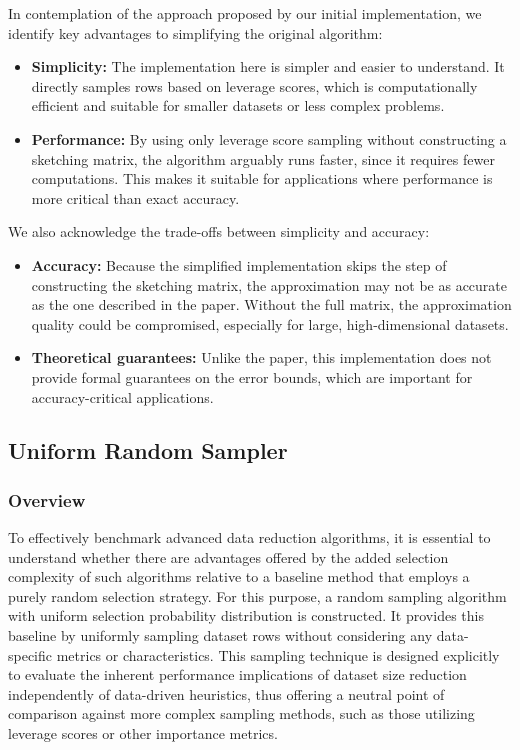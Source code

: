 \documentclass{article}
\theoremstyle{plain}
\theoremstyle{definition}
\theoremstyle{remark}
\begin{document}
In contemplation of the approach proposed by our initial implementation, we identify key advantages to simplifying the original algorithm:

\begin{itemize}

\item \textbf{Simplicity:} The implementation here is simpler and easier to understand. It directly samples rows based on leverage scores, which is computationally efficient and suitable for smaller datasets or less complex problems.

\item \textbf{Performance:} By using only leverage score sampling without constructing a sketching matrix, the algorithm arguably runs faster, since it requires fewer computations. This makes it suitable for applications where performance is more critical than exact accuracy.

\end{itemize}

We also acknowledge the trade-offs between simplicity and accuracy:

\begin{itemize}

\item \textbf{Accuracy:} Because the simplified implementation skips the step of constructing the sketching matrix, the approximation may not be as accurate as the one described in the paper. Without the full matrix, the approximation quality could be compromised, especially for large, high-dimensional datasets.

\item \textbf{Theoretical guarantees:} Unlike the paper, this implementation does not provide formal guarantees on the error bounds, which are important for accuracy-critical applications.

\end{itemize}


\subsection{Uniform Random Sampler}

\subsubsection{Overview}

To effectively benchmark advanced data reduction algorithms, it is essential to understand whether there are advantages offered by the added selection complexity of such algorithms relative to a baseline method that employs a purely random selection strategy. For this purpose, a random sampling algorithm with uniform selection probability distribution is constructed. It provides this baseline by uniformly sampling dataset rows without considering any data-specific metrics or characteristics. This sampling technique is designed explicitly to evaluate the inherent performance implications of dataset size reduction independently of data-driven heuristics, thus offering a neutral point of comparison against more complex sampling methods, such as those utilizing leverage scores or other importance metrics.
\end{document}

